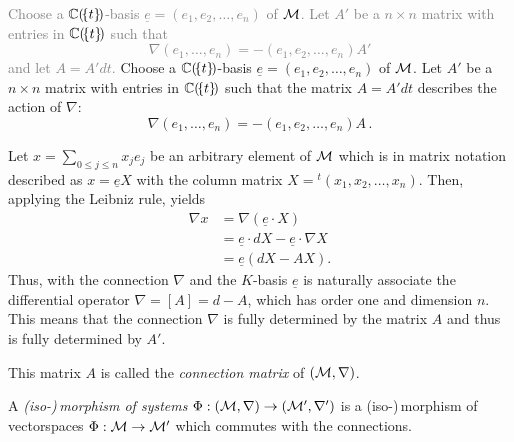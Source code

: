 \begin{paracol}{2}\sloppy
\switchcolumn[0]\noindent
  \textcolor{gray}{Choose a $\mathbb{C}(\!\{t\}\!)$-basis
    $\underline{e}=(e_1,e_2,\dots,e_n)$ of $\mathcal{M}$.  Let $A'$ be a $n\times n$
    matrix with entries in $\mathbb{C}(\!\{t\}\!)$ such that
    \[
      \nabla\left(e_1,\dots,e_n\right)
      =
      -(e_1,e_2,\dots,e_n)A'
    \]
    and let $A=A'dt$.}
\switchcolumn[1]\noindent
  Choose a $\mathbb{C}(\!\{t\}\!)$-basis $\underline{e}=(e_1,e_2,\dots,e_n)$ of $\mathcal{M}$.
  Let $A'$ be a $n\times n$ matrix with entries in $\mathbb{C}(\!\{t\}\!)$ such that
  the matrix $A=A'dt$ describes the action of $\nabla$:
  \[
    \nabla\left(e_1,\dots,e_n\right)
    =
    -(e_1,e_2,\dots,e_n)A \,.
  \]
\end{paracol}
Let $x=\sum_{0\leq j\leq n}x_je_j$ be an arbitrary element of $\mathcal{M}$ which is in
matrix notation described as $x=\underline{e}X$ with the column matrix
$X={}^t\!(x_1,x_2 ,\dots,x_n)$.
Then, applying the Leibniz rule, yields
\begin{align*}
  \nabla x&=\nabla\left(\underline{e}\cdot X\right)
  \\&=\underline{e} \cdot dX - \underline{e}\cdot \nabla X
  \\&=\underline{e}\left(dX-AX\right).
\end{align*}
Thus, with the connection $\nabla$ and the $K$-basis $\underline{e}$ is
naturally associate the differential operator $\nabla=[A]=d-A$, which has order
one and dimension $n$. This means that the connection $\nabla$ is fully
determined by the matrix $A$ and thus is fully determined by $A'$.
\begin{defn}
  This matrix $A$ is called the \emph{connection matrix} of $(\mathcal{M},\nabla)$.
\end{defn}
\begin{defn}
  A \emph{(iso-)\,morphism of systems} $\Phi:(\mathcal{M},\nabla)\to(\mathcal{M}',\nabla')$
  is a (iso-)\,morphism of vectorspaces $\Phi:\mathcal{M}\to\mathcal{M}'$ which commutes with the
  connections.
\end{defn}
\begin{comment}
  \cite{boalch} wants \textbf{generic} meromorphic connections
  \begin{itemize}
    \item\dots simplest jet sufficient\dots
  \end{itemize}
\end{comment}

